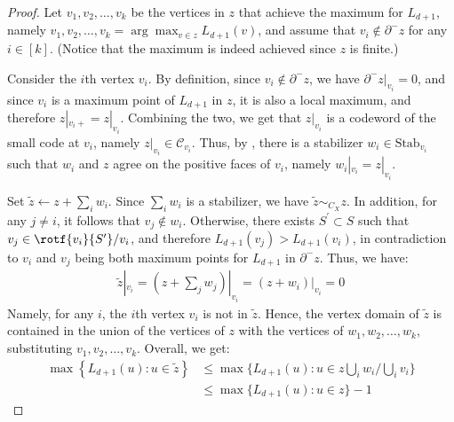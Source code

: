 \begin{proof}
  Let $v_{1}, v_{2}, \ldots, v_{k}$ be the vertices in $z$ that achieve the maximum for $L_{d+1}$, namely $v_{1}, v_{2}, \ldots, v_{k} = \arg \max_{v \in z} L_{d+1}(v)$, and assume that $v_{i} \notin \partial^{-} z$ for any $i \in [k]$. (Notice that the maximum is indeed achieved since $z$ is finite.)

Consider the $i$th vertex $v_{i}$. By definition, since $v_{i} \notin \partial^{-} z$, we have $\partial^{-} z|_{v_{i}} = 0$, and since $v_{i}$ is a maximum point of $L_{d+1}$ in $z$, it is also a local maximum, and therefore $z|_{v_{i}+} = z|_{v_{i}}$. 
Combining the two, we get that $z|_{v_{i}}$ is a codeword of the small code at $v_{i}$, namely $z|_{v_{i}} \in \mathcal{C}_{v_{i}}$. Thus, by , there is a stabilizer $w_{i} \in \text{Stab}_{v_{i}}$ such that $w_{i}$ and $z$ agree on the positive faces of $v_{i}$, namely $w_{i}|_{v_{i}} = z|_{v_{i}}$. 

Set $\tilde{z} \leftarrow z + \sum_{i}w_{i}$. Since $\sum_{i}w_{i}$ is a stabilizer, we have $\tilde{z} \sim_{C_{X}} z$. In addition, for any $j \neq i$, it follows that $v_{j} \notin w_{i}$.
Otherwise, there exists $S^{\prime} \subset S$ such that $v_{j} \in \rotf{v_{i}}{S^{\prime}}/ v_{i}$, and therefore $L_{d+1}(v_{j}) > L_{d+1}(v_{i})$, in contradiction to $v_{i}$ and $v_{j}$ being both maximum points for $L_{d+1}$ in $\partial^{-} z$. 
Thus, we have:
\begin{equation*}
  \begin{split}
    \tilde{z}|_{v_{i}} = (z + \sum_{j}w_{j})|_{v_{i}} =  (z + w_{i})|_{v_{i}} = 0
  \end{split}
\end{equation*}
Namely, for any $i$, the $i$th vertex $v_{i}$ is not in $\tilde{z}$. Hence, the vertex domain of $\tilde{z}$ is contained in the union of the vertices of $z$ with the vertices of $w_{1}, w_{2}, \ldots, w_{k}$, substituting $v_{1}, v_{2}, \ldots, v_{k}$. Overall, we get:
\begin{equation*}
  \begin{split}
  \max \left\{ L_{d+1}(u) : u \in \tilde{z} \right\} & \le \max \big\{ L_{d+1}(u) : u \in z \bigcup_{i} w_{i} \big/ \bigcup_{i} v_{i} \big\}  \\ 
     & \le  \max \big\{ L_{d+1}(u) : u \in z \big\} - 1
  \end{split}
\end{equation*}
\end{proof}



